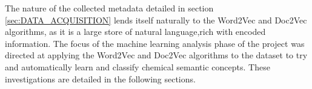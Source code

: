 The nature of the collected metadata detailed in section \ref{sec:DATA_ACQUISITION} lends itself naturally to the Word2Vec and Doc2Vec algorithms, as it is a large store of natural language,rich with encoded information. The focus of the machine learning analysis phase of the project was directed at applying the Word2Vec and Doc2Vec algorithms to the dataset to try and automatically learn and classify chemical semantic concepts. These investigations are detailed in the following sections.
